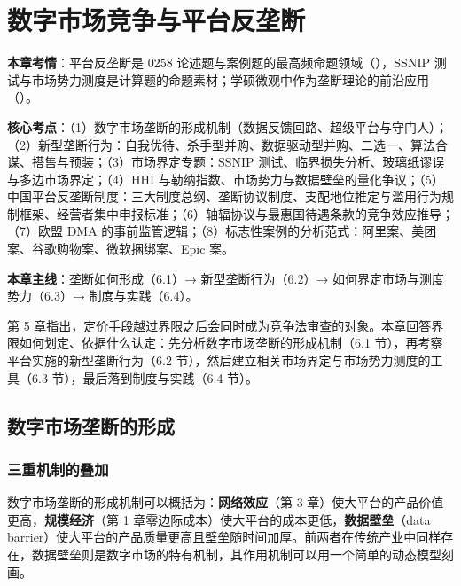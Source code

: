 \chapter{数字市场竞争与平台反垄断}

\begin{examguide}
\textbf{本章考情}：平台反垄断是 0258 论述题与案例题的最高频命题领域（），SSNIP 测试与市场势力测度是计算题的命题素材；学硕微观中作为垄断理论的前沿应用（）。

\textbf{核心考点}：（1）数字市场垄断的形成机制（数据反馈回路、超级平台与守门人）；（2）新型垄断行为：自我优待、杀手型并购、数据驱动型并购、二选一、算法合谋、搭售与预装；（3）市场界定专题：SSNIP 测试、临界损失分析、玻璃纸谬误与多边市场界定；（4）HHI 与勒纳指数、市场势力与数据壁垒的量化争议；（5）中国平台反垄断制度：三大制度总纲、垄断协议制度、支配地位推定与滥用行为规制框架、经营者集中申报标准；（6）轴辐协议与最惠国待遇条款的竞争效应推导；（7）欧盟 DMA 的事前监管逻辑；（8）标志性案例的分析范式：阿里案、美团案、谷歌购物案、微软捆绑案、Epic 案。

\textbf{本章主线}：垄断如何形成（6.1）→ 新型垄断行为（6.2）→ 如何界定市场与测度势力（6.3）→ 制度与实践（6.4）。
\end{examguide}

第 5 章指出，定价手段越过界限之后会同时成为竞争法审查的对象。本章回答界限如何划定、依据什么认定：先分析数字市场垄断的形成机制（6.1 节），再考察平台实施的新型垄断行为（6.2 节），然后建立相关市场界定与市场势力测度的工具（6.3 节），最后落到制度与实践（6.4 节）。

\section{数字市场垄断的形成}

\subsection{三重机制的叠加}

数字市场垄断的形成机制可以概括为：\textbf{网络效应}（第 3 章）使大平台的产品价值更高，\textbf{规模经济}（第 1 章零边际成本）使大平台的成本更低，\textbf{数据壁垒}（data barrier）使大平台的产品质量更高且壁垒随时间加厚。前两者在传统产业中同样存在，数据壁垒则是数字市场的特有机制，其作用机制可以用一个简单的动态模型刻画。

